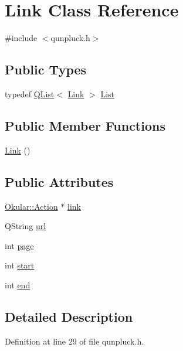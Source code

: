 \hypertarget{classLink}{\section{Link Class Reference}
\label{classLink}
}


{\ttfamily \#include $<$qunpluck.\+h$>$}

\subsection*{Public Types}
\begin{DoxyCompactItemize}
\item 
typedef \hyperlink{classQList}{Q\+List}$<$ \hyperlink{classLink}{Link} $>$ \hyperlink{classLink_a53a12cefd3b644472b5e5ec1c3be07c2}{List}
\end{DoxyCompactItemize}
\subsection*{Public Member Functions}
\begin{DoxyCompactItemize}
\item 
\hyperlink{classLink_a1918a8473cee40bbed17b8e926cb85d9}{Link} ()
\end{DoxyCompactItemize}
\subsection*{Public Attributes}
\begin{DoxyCompactItemize}
\item 
\hyperlink{classOkular_1_1Action}{Okular\+::\+Action} $\ast$ \hyperlink{classLink_aed1992084326da1e4ff2e5945f347c44}{link}
\item 
Q\+String \hyperlink{classLink_a7fb909ac63ae82139c3cf3a84cb367b1}{url}
\item 
int \hyperlink{classLink_aca0c87c763f33f0c2711cf860019b323}{page}
\item 
int \hyperlink{classLink_ab8d456d8c98a6af039618dbe624c9014}{start}
\item 
int \hyperlink{classLink_a21ef118516d41dea7945c778b964aac9}{end}
\end{DoxyCompactItemize}


\subsection{Detailed Description}


Definition at line 29 of file qunpluck.\+h.



